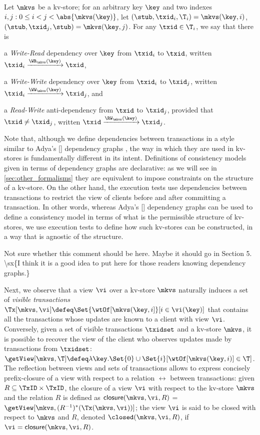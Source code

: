 Let $\mkvs$ be a kv-store; for an arbitrary key $\key$ and 
two indexes $i,j: 0 \leq i < j < \abs{ \mkvs(\key) }$, let 
$(\stub, \txid_{i}, \T_{i}) = \mkvs(\key, i)$, $(\stub, \txid_{j}, \stub) = \mkvs(\key,j)$. 
For any $\txid \in \T_{i}$, we say that there is 
\begin{enumerate*} 
\item a \emph{Write-Read} dependency over 
$\key$ from $\txid_{i}$ to $\txid$, written $\txid_{i} \xrightarrow{\WR_{\mkvs}(\key)} \txid$, 
\item a \emph{Write-Write} dependency over $\key$ from $\txid_{i}$ to $\txid_{j}$, 
written $\txid_{i} \xrightarrow{\WW_{\mkvs}(\key)} \txid_{j}$, and 
\item a \emph{Read-Write} anti-dependency from $\txid$ to $\txid_{j}$, provided that 
$\txid \neq \txid_{j}$, written $\txid \xrightarrow{\RW_{\mkvs}(\key)} \txid_{j}$.
\end{enumerate*}

Note that, although we define dependencies between transactions in a style 
similar to Adya's [\citeyear{adya}] dependency graphs , the way in which they are used 
in kv-stores is fundamentally different in its intent. Definitions of consistency 
models given in terms of dependency graphs are declarative: as 
we will see in \cref{sec:other_formalisms} they are equivalent to impose 
constraints on the structure of a kv-store. On the other hand, the execution 
tests use dependencies between transactions to restrict 
the view of clients before and after committing a transaction. In other words, 
whereas Adya's [\citeyear{adya}] dependency graphs can be used to define a consistency model 
in terms of what is the permissible structure of kv-stores, we use execution tests
to define how such kv-stores can be constructed, in a way that is agnostic of the structure.

\ac{Not sure whether this comment should be here. Maybe it should go in Section 5.
\sx{I think it is a good idea to put here for those readers knowing dependency graphs.}
}

Next, we observe that a view $\vi$ over a kv-store $\mkvs$ naturally induces a 
set of \emph{visible transactions} $\Tx[\mkvs, \vi] \defeq \Set{\wtOf[\mkvs(\key, i] }[ i \in \vi(\key)]$ 
that contains all the transactions whose updates are known to a client with view $\vi$. 
Conversely, given a set of visible transactions $\txidset$ and a kv-store $\mkvs$, it is 
possible to recover the view of the client
who observes updates made by transactions from \( \txidset \):
$\getView[\mkvs, \T] \defeq \lambda \key. \Set{0} \cup \Set{i }[ \wtOf[\mkvs(\key, i)] \in \T]$. 
The reflection between views and sets of transactions allows to express concisely 
prefix-closure of a view with respect to a relation $\rel$ between 
transactions: given $R \subseteq \TxID \times \TxID$, the closure of 
a view $\vi$ with respect to the kv-store $\mkvs$ and the relation $R$ is defined as $\mathsf{closure}(\mkvs, \vi, R)$ 
= $\getView[\mkvs, (R^{-1})^{\ast}(\Tx(\mkvs, \vi))]$; the view $\vi$ is said to be closed with respect to $\mkvs$ and $R$, denoted 
$\closed(\mkvs, \vi, R)$,  if $\vi = \mathsf{closure}(\mkvs,\vi,R)$.

